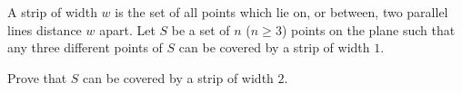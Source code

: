A strip of width $w$ is the set of all points which lie on, or between, two parallel lines distance $w$ apart. Let $S$ be a set of $n$ ($n \ge 3$) points on the plane such that any three different points of $S$ can be covered by a strip of width $1$.

Prove that $S$ can be covered by a strip of width $2$.